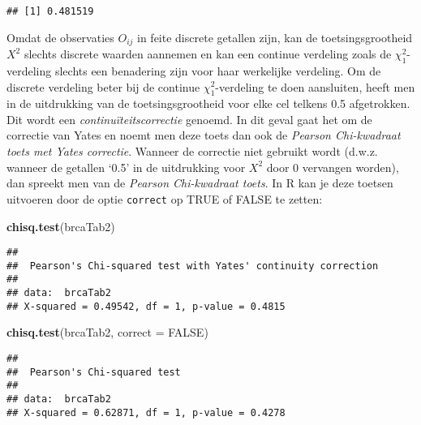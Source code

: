 \documentclass[
  12pt,dutch,coursenotes]{book}
\newenvironment{Shaded}{\begin{snugshade}}{\end{snugshade}}
\newcommand{\DataTypeTok}[1]{\textcolor[rgb]{0.13,0.29,0.53}{#1}}
\newcommand{\KeywordTok}[1]{\textcolor[rgb]{0.13,0.29,0.53}{\textbf{#1}}}
\newcommand{\NormalTok}[1]{#1}
\newcommand{\OtherTok}[1]{\textcolor[rgb]{0.56,0.35,0.01}{#1}}
\theoremstyle{definition}
\theoremstyle{definition}
\theoremstyle{definition}
\theoremstyle{remark}
\begin{document}
\begin{verbatim}
## [1] 0.481519
\end{verbatim}

Omdat de observaties \(O_{ij}\) in feite discrete getallen zijn, kan de
toetsingsgrootheid \(X^2\) slechts discrete waarden aannemen en kan een
continue verdeling zoals de \(\chi^2_1\)-verdeling slechts een benadering zijn
voor haar werkelijke verdeling. Om de discrete verdeling beter bij de
continue \(\chi^2_1\)-verdeling te doen aansluiten, heeft men in de
uitdrukking van de toetsingsgrootheid voor elke cel telkens 0.5 afgetrokken. Dit wordt een
\emph{continuïteitscorrectie} genoemd. In dit geval gaat het om de
correctie van Yates en noemt men deze toets dan ook de \emph{Pearson
Chi-kwadraat toets met Yates correctie}. Wanneer de correctie niet gebruikt
wordt (d.w.z. wanneer de getallen `0.5' in de uitdrukking voor \(X^2\) door 0
vervangen worden), dan spreekt men van de \emph{Pearson Chi-kwadraat toets}.
In R kan je deze toetsen uitvoeren door de optie \texttt{correct} op TRUE of FALSE te zetten:

\begin{Shaded}
\begin{Highlighting}[]
\KeywordTok{chisq.test}\NormalTok{(brcaTab2)}
\end{Highlighting}
\end{Shaded}

\begin{verbatim}
## 
##  Pearson's Chi-squared test with Yates' continuity correction
## 
## data:  brcaTab2
## X-squared = 0.49542, df = 1, p-value = 0.4815
\end{verbatim}

\begin{Shaded}
\begin{Highlighting}[]
\KeywordTok{chisq.test}\NormalTok{(brcaTab2, }\DataTypeTok{correct =} \OtherTok{FALSE}\NormalTok{)}
\end{Highlighting}
\end{Shaded}

\begin{verbatim}
## 
##  Pearson's Chi-squared test
## 
## data:  brcaTab2
## X-squared = 0.62871, df = 1, p-value = 0.4278
\end{verbatim}
\end{document}
